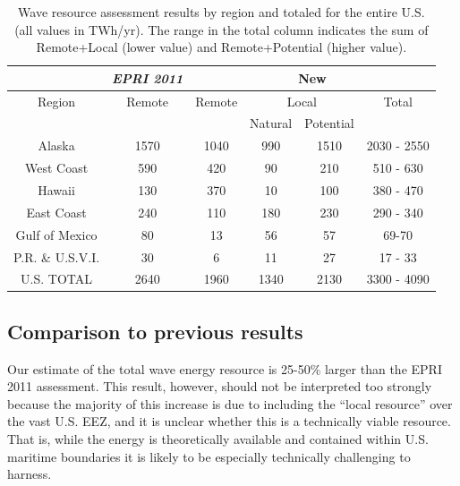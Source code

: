 \begin{table}[ht]
  \centering
  \begin{tabular}{|c|c|c|c|c|c|}
    \cline{2-6}
    \multicolumn{1}{c|}{} & {\it EPRI 2011} & \multicolumn{4}{c|}{New} \\
    \hline
    Region & Remote  & Remote & \multicolumn{2}{c|}{Local} & Total \\
    & & & Natural & Potential & \\
    \hline
    Alaska & 1570 & 1040 & 990 & 1510 & 2030 - 2550 \\
    West Coast & 590 & 420 & 90 & 210 & 510 - 630 \\
    Hawaii & 130 & 370 & 10 & 100 & 380 - 470 \\
    East Coast & 240 & 110 & 180 & 230 & 290 - 340 \\
    Gulf of Mexico & 80 & 13 & 56 & 57 & 69-70 \\
    P.R. \& U.S.V.I. & 30 & 6 & 11 & 27 & 17 - 33 \\
    \hline \hline
U.S. TOTAL & 2640 & 1960 & 1340 & 2130 & 3300 - 4090 \\
\hline
  \end{tabular}
  \caption{Wave resource assessment results by region and totaled for the entire U.S. (all values in TWh/yr). The range in the total column indicates the sum of Remote+Local (lower value) and Remote+Potential (higher value). }
  \label{table:totals}
\end{table}

\subsection{Comparison to previous results}


Our estimate of the total wave energy resource is 25-50\% larger than the EPRI 2011 assessment. This result, however, should not be interpreted too strongly because the majority of this increase is due to including the ``local resource'' over the vast U.S. EEZ, and it is unclear whether this is a technically viable resource. That is, while the energy is theoretically available and contained within U.S. maritime boundaries it is likely to be especially technically challenging to harness.


